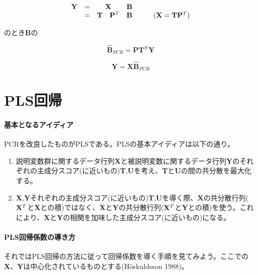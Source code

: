 \[
\begin{array}{ccccl}
{\mathbf Y} & = & \multicolumn{2}{c}{\bf X} &{\mathbf B} \\
            & = & {\mathbf T} & {\mathbf P}^T &{\mathbf B} \hspace{3em}({\mathbf X} = {\mathbf T}{\mathbf P}^T)\\
\end{array}
\]

のとき{\bf B}の

\[\hat{\mathbf B}_{PCR} = {\mathbf P}{\mathbf T}^{\#}{\mathbf Y}\]

\[{\mathbf Y} = {\mathbf X}\hat{\mathbf B}_{PCR}\]

\section{PLS回帰}
\paragraph{基本となるアイディア}
PCRを改良したものがPLSである。PLSの基本アイディアは以下の通り。

\begin{enumerate}
\item 説明変数群に関するデータ行列{\bf X}と被説明変数に関するデータ行列{\bf Y}のそれぞれの主成分スコア(に近いもの){\bf T},{\bf U}を考え、{\bf T}と{\bf U}の間の共分散を最大化する。
\item {\bf X},{\bf Y}それぞれの主成分スコア(に近いもの){\bf T},{\bf U}を導く際、{\bf X}の共分散行列(\({\bf X}^T\)と{\bf X}との積)ではなく、{\bf X}と{\bf Y}の共分散行列(\({\bf X}^T\)と{\bf Y}との積)を使う。これにより、{\bf X}と{\bf Y}の相関を加味した主成分スコア(に近いもの)になる。
\end{enumerate}

\paragraph{PLS回帰係数の導き方}

それではPLS回帰の方法に従って回帰係数を導く手順を見てみよう。ここでの{\bf X}、{\bf Y}は中心化されているものとする(H\"{o}skuldsson 1988)。


